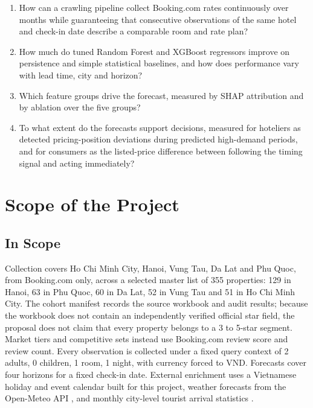 \begin{enumerate}[leftmargin=*, itemsep=1pt, parsep=0pt, topsep=2pt]
    \item How can a crawling pipeline collect Booking.com rates continuously over months while guaranteeing that consecutive observations of the same hotel and check-in date describe a comparable room and rate plan?
    \item How much do tuned Random Forest and XGBoost regressors improve on persistence and simple statistical baselines, and how does performance vary with lead time, city and horizon?
    \item Which feature groups drive the forecast, measured by SHAP attribution and by ablation over the five groups?
    \item To what extent do the forecasts support decisions, measured for hoteliers as detected pricing-position deviations during predicted high-demand periods, and for consumers as the listed-price difference between following the timing signal and acting immediately?
\end{enumerate}

\section{Scope of the Project}

\subsection{In Scope}

Collection covers Ho Chi Minh City, Hanoi, Vung Tau, Da Lat and Phu Quoc, from Booking.com only, across a selected master list of 355 properties: 129 in Hanoi, 63 in Phu Quoc, 60 in Da Lat, 52 in Vung Tau and 51 in Ho Chi Minh City. The cohort manifest records the source workbook and audit results; because the workbook does not contain an independently verified official star field, the proposal does not claim that every property belongs to a 3 to 5-star segment. Market tiers and competitive sets instead use Booking.com review score and review count. Every observation is collected under a fixed query context of 2 adults, 0 children, 1 room, 1 night, with currency forced to VND. Forecasts cover four horizons for a fixed check-in date. External enrichment uses a Vietnamese holiday and event calendar built for this project, weather forecasts from the Open-Meteo API \citep{openmeteo2024}, and monthly city-level tourist arrival statistics \citep{vnat2024, gso2024}.


